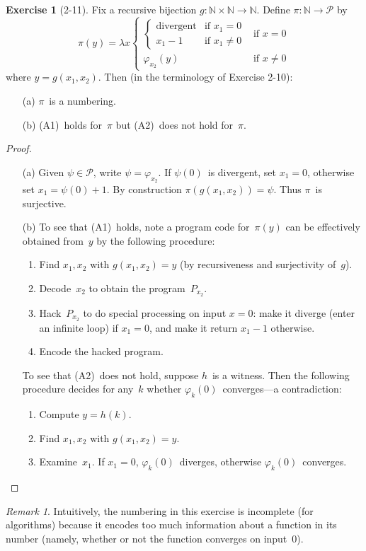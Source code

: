 \documentclass[letterpaper]{article}
\newcommand{\N}{\mathbb{N}}
\renewcommand{\P}{\mathcal{P}}
\theoremstyle{definition}
\newtheorem*{exer}{Exercise}
\theoremstyle{remark}
\newtheorem*{rmk}{Remark}
\theoremstyle{direction}
\begin{document}
\begin{exer}[2-11]
Fix a recursive bijection $g:\N\times\N\to\N$. Define $\pi:\N\to\P$ by
$$\pi(y)=\lambda x
\begin{cases}
\begin{cases}
\text{divergent}&\text{if }x_1=0\\
x_1-1&\text{if }x_1\ne0
\end{cases}&\text{if }x=0\\
\varphi_{x_2}(y)&\text{if }x\ne0
\end{cases}$$
where $y=g(x_1,x_2)$. Then (in the terminology of Exercise 2-10):
\begin{enumerate}[itemsep=0pt]
\item[(a)] $\pi$~is a numbering.
\item[(b)] (A1)~holds for~$\pi$ but (A2)~does not hold for~$\pi$.
\end{enumerate}
\end{exer}
\begin{proof}
\begin{enumerate}[itemsep=0pt]
\item[(a)] Given $\psi\in\P$, write $\psi=\varphi_{x_2}$. If $\psi(0)$~is divergent, set $x_1=0$, otherwise set $x_1=\psi(0)+1$. By construction $\pi(g(x_1,x_2))=\psi$. Thus $\pi$~is surjective.

\item[(b)] To see that (A1)~holds, note a program code for~$\pi(y)$ can be effectively obtained from~$y$ by the following procedure:
\begin{enumerate}[itemsep=0pt,label=\arabic{*}.]
\item Find $x_1,x_2$ with $g(x_1,x_2)=y$ (by recursiveness and surjectivity of~$g$).
\item Decode~$x_2$ to obtain the program~$P_{x_2}$.
\item Hack~$P_{x_2}$ to do special processing on input $x=0$: make it diverge (enter an infinite loop) if $x_1=0$, and make it return $x_1-1$ otherwise.
\item Encode the hacked program.
\end{enumerate}

To see that (A2)~does not hold, suppose $h$~is a witness. Then the following procedure decides for any~$k$ whether $\varphi_k(0)$~converges---a contradiction:
\begin{enumerate}[itemsep=0pt,label=\arabic{*}.]
\item Compute $y=h(k)$.
\item Find $x_1,x_2$ with $g(x_1,x_2)=y$.
\item Examine~$x_1$. If $x_1=0$, $\varphi_k(0)$~diverges, otherwise $\varphi_k(0)$~converges.\qedhere
\end{enumerate}
\end{enumerate}
\end{proof}
\begin{rmk}
Intuitively, the numbering in this exercise is incomplete (for algorithms) because it encodes too much information about a function in its number (namely, whether or not the function converges on input~$0$).
\end{rmk}
\end{document}

